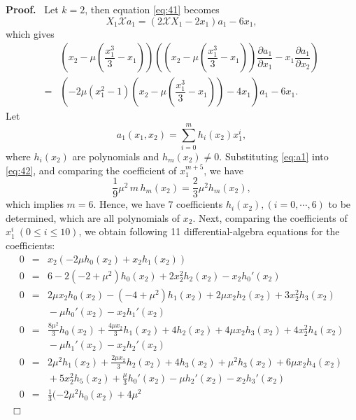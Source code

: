 \documentclass[preprint,12pt]{elsarticle}
\newenvironment{proof}[1][Proof]{\textbf{#1.}\ }{\ $\Box$}
\begin{document}
\begin{proof}
Let $k = 2$, then equation \eqref{eq:41} becomes
\begin{equation}
X_1 \mathscr{X}a_1 = (2 \mathscr{X}X_1 - 2  x_1
)  a_1 - 6  x_1,
\end{equation}
which gives
\begin{equation}
\label{eq:42} \begin{array}{rl} 
&\left(x_2 - \mu (\dfrac{x_1^3}{3} - x_1)\right) \left((x_2 -
\mu (\dfrac{x_1^3}{3} - x_1)) \dfrac{\partial a_1}{\partial x_1}
-x_1  \dfrac{\partial a_1}{\partial x_2}\right)\\
 = &\left(-2 \mu  (x_1^2 - 1) (x_2 - \mu (\dfrac{x_1^3}{3} - x_1)) - 4 x_1\right) a_1 - 6  x_1.
\end{array}
\end{equation}
Let
\begin{equation}
\label{eq:a1}
a_1(x_1,x_2) = \sum_{i = 0}^m h_i(x_2)  x_1^i,
\end{equation}
where $h_i(x_2)$ are polynomials and $h_m(x_2) \not=0$. Substituting
\eqref{eq:a1} into \eqref{eq:42}, and comparing the coefficient
of $x_1^{m+5}$, we have
$$\frac{1}{9}  \mu^2\, m\, h_m(x_2) = \frac{2}{3} \mu^2 h_m(x_2),$$
which implies $m = 6$. Hence, we have $7$ coefficients $h_i(x_2), (i
= 0,\cdots , 6)$ to be determined, which are all polynomials of $x_2$. Next, comparing the coefficients of $x_1^{i}\ ( 0\leq
i\leq 10)$, we obtain following 11 differential-algebra equations for the coefficients: 
\begin{eqnarray*}
0 &=& x_2  ( -2  \mu    h_0(x_2) +
x_2   h_1(x_2) )\\
0 &=& 6 - 2  ( -2 + {\mu }^2)    h_0(x_2)
+ 2  x_2^2   h_2(x_2) - x_2   h_0'(x_2)\\
0 &=& 2  \mu  x_2  h_0(x_2) - ( -4 + {\mu }^2 )  h_1(x_2) +
2  \mu  x_2  h_2(x_2) +
  3  x_2^2   h_3(x_2)\\
&&{} - \mu  h_0'(x_2) -
  x_2 h_1'(x_2)\\
 0 &=& \frac{8  \mu^2}{3}   h_0(x_2) + \frac{4  \mu  x_2 }{3}
 h_1(x_2) + 4   h_2(x_2) +
  4  \mu  x_2    h_3(x_2) + 4  x_2^2   h_4(x_2)\\
&&{} - \mu    h_1'(x_2) -
  x_2   h_2'(x_2)\\
0 &=& 2  {\mu }^2   h_1(x_2) + \frac{2  \mu  x_2 }{3} 
h_2(x_2) + 4  h_3(x_2) +
  {\mu }^2   h_3(x_2) + 6  \mu  x_2    h_4(x_2)\\
  &&{} + 5  x_2^2   h_5(x_2) +
  \frac{\mu }{3}   h_0'(x_2) - \mu    h_2'(x_2) -
  x_2   h_3'(x_2)\\
0 &=& \frac{1}{3}(-2  {\mu }^2   h_0(x_2) + 4  {\mu }^2 

\end{eqnarray*}
\end{proof}
\end{document}
